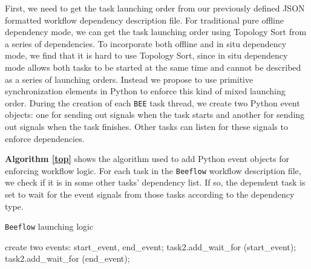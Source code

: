 First, we need to get the task launching order from our previously defined JSON formatted workflow dependency description file. For traditional pure offline dependency mode, we can get the task launching order using Topology Sort from a series of dependencies. To incorporate both offline and in situ dependency mode, we find that it is hard to use Topology Sort, since in situ dependency mode allows both tasks to be started at the same time and cannot be described as a series of launching orders. Instead we propose to use primitive synchronization elements in Python to enforce this kind of mixed launching order. During the creation of each \texttt{BEE} task thread, we create two Python event objects: one for sending out signals when the task starts and another for sending out signals when the task finishes. Other tasks can listen for these signals to enforce dependencies. 

\textbf{Algorithm \ref{top}} shows the algorithm used to add Python event objects for enforcing workflow logic. For each task in the \texttt{Beeflow} workflow description file, we check if it is in some other tasks' dependency list. If so, the dependent task is set to wait for the event signals from those tasks according to the dependency type.

\begin{algorithm}
\caption{\texttt{Beeflow} launching logic}
\label{top}
\begin{algorithmic}[1]
	\STATE create two events: start\_event, end\_event;
				\STATE task2.add\_wait\_for (start\_event);
			\ENDIF
				\STATE task2.add\_wait\_for (end\_event);
			\ENDIF
    	\ENDIF
      \ENDFOR 
\ENDFOR
\end{algorithmic}
\end{algorithm}

